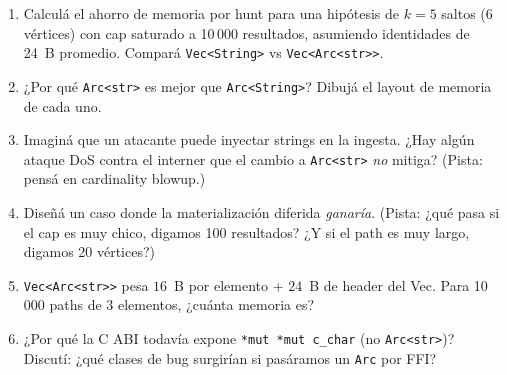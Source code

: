 \begin{ejercicios}
\begin{enumerate}
    \item \starred{} Calculá el ahorro de memoria por hunt para una
    hipótesis de \(k = 5\) saltos (\(6\) vértices) con cap saturado
    a 10\,000 resultados, asumiendo identidades de 24~B promedio.
    Compará \texttt{Vec<String>} vs \texttt{Vec<Arc<str>>}.

    \item ¿Por qué \texttt{Arc<str>} es mejor que \texttt{Arc<String>}?
    Dibujá el layout de memoria de cada uno.

    \item \starred{} Imaginá que un atacante puede inyectar strings
    en la ingesta. ¿Hay algún ataque DoS contra el interner que el
    cambio a \texttt{Arc<str>} \emph{no} mitiga? (Pista: pensá en
    cardinality blowup.)

    \item Diseñá un caso donde la materialización diferida
    \emph{ganaría}. (Pista: ¿qué pasa si el cap es muy chico, digamos
    100 resultados? ¿Y si el path es muy largo, digamos 20 vértices?)

    \item \texttt{Vec<Arc<str>>} pesa \(16\)~B por elemento + \(24\)~B
    de header del Vec. Para 10\,000 paths de 3 elementos, ¿cuánta
    memoria es?

    \item ¿Por qué la C ABI todavía expone \texttt{*mut *mut
    c\_char} (no \texttt{Arc<str>})? Discutí: ¿qué clases de bug
    surgirían si pasáramos un \texttt{Arc} por FFI?
\end{enumerate}
\end{ejercicios}
